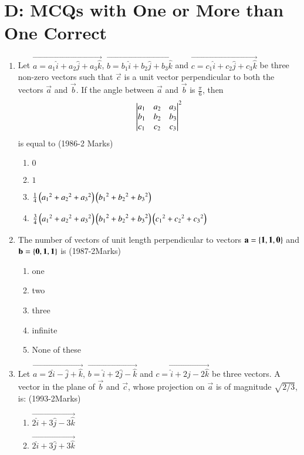 \documentclass[journal,12pt,twocolumn]{IEEEtran}
\theoremstyle{remark}
\begin{document}
 \section{D: MCQs with One or More than One Correct}
\begin{enumerate}
	\item %
		Let $\vec{a=a_1\hat{i}+a_2\hat{j}+a_3\hat{k}}$, $\vec{b=b_1\hat{i}+b_2\hat{j}+b_3\hat{k}}$ and $\vec{c=c_1\hat{i}+c_2\hat{j}+c_3\hat{k}}$ be three non-zero vectors such that $\vec{c}$ is a unit vector perpendicular to both the vectors $\vec{a}$ and $\vec{b}$. If the angle between $\vec{a}$ and $\vec{b}$ is $\frac{\pi}{6}$, then \\
\[
	\begin{vmatrix}
a_1 & a_2 & a_3 \\
b_1 & b_2 & b_3 \\
c_1 & c_2 & c_3
\end{vmatrix}^2
\]
 is equal to \hfill{(1986-2 Marks)}\\
		\begin{enumerate}
			\item $0$
			\item $1$
			\item $\frac{1}{4}\left({a_1}^2+{a_2}^2+{a_3}^2\right)\left({b_1}^2+{b_2}^2+{b_3}^2\right)$
			\item $\frac{3}{4}\left({a_1}^2+{a_2}^2+{a_3}^2\right)\left({b_1}^2+{b_2}^2+{b_3}^2\right)\left({c_1}^2+{c_2}^2+{c_3}^2\right)$
		\end{enumerate}
\item %
	The number of vectors of unit length perpendicular to vectors $\mathbf{a=\left\{1,1,0\right\}}$ and $\mathbf{b=\left\{0,1,1\right\}}$ is \hfill{(1987-2Marks)}\\
		\begin{enumerate}
			\item one
		        \item two
			\item three
			\item infinite
			\item None of these
		\end{enumerate}
\item %
	Let $\vec{a=2\hat{i}-\hat{j}+\hat{k}}$, $\vec{b=\hat{i}+2\hat{j}-\hat{k}}$ and $\vec{c=\hat{i}+2\hat{j}-2\hat{k}}$ be three vectors. A vector in the plane of $\vec{b}$ and $\vec{c}$, whose projection on $\vec{a}$ is of magnitude $\sqrt{2/3}$, is: \hfill{(1993-2Marks)}\\
		\begin{enumerate}
			\item $\vec{2\hat{i}+3\hat{j}-3\hat{k}}$
			\item $\vec{2\hat{i}+3\hat{j}+3\hat{k}}$

\end{enumerate}
\end{enumerate}
\end{document}
